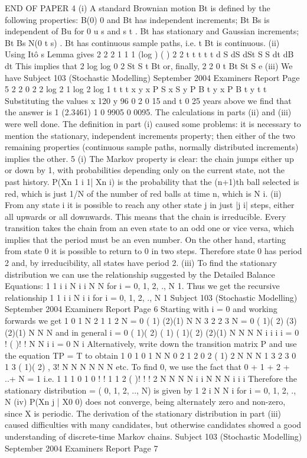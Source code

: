 END OF PAPER
4 (i) A standard Brownian motion {Bt} is defined by the following properties:
B(0) 0 and Bt has independent increments; Bt Bs is independent of
Bu for 0 u s and s t .
Bt has stationary and Gaussian increments; Bt Bs N(0 t s) .
Bt has continuous sample paths, i.e. t Bt is continuous.
(ii) Using Itô s Lemma gives
2
2
2
1 1 1
(log ) ( )
2
2
t t
t t
t
d S dS dSt
S S
dt dB dt
This implies that
2
log log 0
2 St S t Bt
or, finally,
2
2
0
t Bt
St S e
(iii) We have
Subject 103 (Stochastic Modelling) September 2004 Examiners Report
Page 5
2
2
0
2
2
log
2
1
log
2
log
1
t t
t
x
y
x
P S x S y P B t
y
x
P B t
y
t
t
Substituting the values x 120 y 96 0 2 0 15 and t 0 25 years
above we find that the answer is
1 (2.3461) 1 0 9905 0 0095.
The calculations in parts (ii) and (iii) were well done. The definition in part
(i) caused some problems: it is necessary to mention the stationary,
independent increments property; then either of the two remaining properties
(continuous sample paths, normally distributed increments) implies the other.
5 (i) The Markov property is clear: the chain jumps either up or down by 1, with
probabilities depending only on the current state, not the past history.
P(Xn 1 i 1| Xn i) is the probability that the (n+1)th ball selected is red,
which is just 1/N of the number of red balls at time n, which is N i.
(ii) From any state i it is possible to reach any other state j in just |j i| steps,
either all upwards or all downwards. This means that the chain is irreducible.
Every transition takes the chain from an even state to an odd one or vice versa,
which implies that the period must be an even number.
On the other hand, starting from state 0 it is possible to return to 0 in two
steps. Therefore state 0 has period 2 and, by irreducibility, all states have
period 2.
(iii) To find the stationary distribution we can use the relationship suggested by the
Detailed Balance Equations:
1
1
i i
N i i
N N
for i = 0, 1, 2, ., N 1.
Thus we get the recursive relationship
1 1 i i
N i
i
for i = 0, 1, 2, ., N 1
Subject 103 (Stochastic Modelling) September 2004 Examiners Report
Page 6
Starting with i = 0 and working forwards we get
1 0 1
N
2 1
1
2
N
= 0
( 1)
(2)(1)
N N
3 2
2
3
N
= 0
( 1)( 2)
(3)(2)(1)
N N N
and in general
i = 0
( 1)( 2) ( 1)
( 1)( 2) (2)(1)
N N N N i
i i i
= 0
!
( )! !
N
N i i
= 0
N
i
Alternatively, write down the transition matrix P and use the equation TP =
T to obtain
1 0 1 0
1
N
N
0 2 1 2 0
2 ( 1)
2
N N
N
1 3 2 3 0
1 3 ( 1)( 2)
,
3!
N N N N
N N
etc.
To find 0, we use the fact that 0 + 1 + 2 + ..+ N = 1
i.e.
1 1
1
0
1 0
! ! 1
1 2
( )! ! ! 2
N N
N
N
i i
N N
N i i i
Therefore the stationary distribution = ( 0, 1, 2, .., N) is given by
1
2 i N
N
i
for i = 0, 1, 2, ., N
(iv) P(Xn j | X0 0) does not converge, being alternately zero and non-zero,
since X is periodic.
The derivation of the stationary distribution in part (iii) caused difficulties
with many candidates, but otherwise candidates showed a good understanding
of discrete-time Markov chains.
Subject 103 (Stochastic Modelling) September 2004 Examiners Report
Page 7
